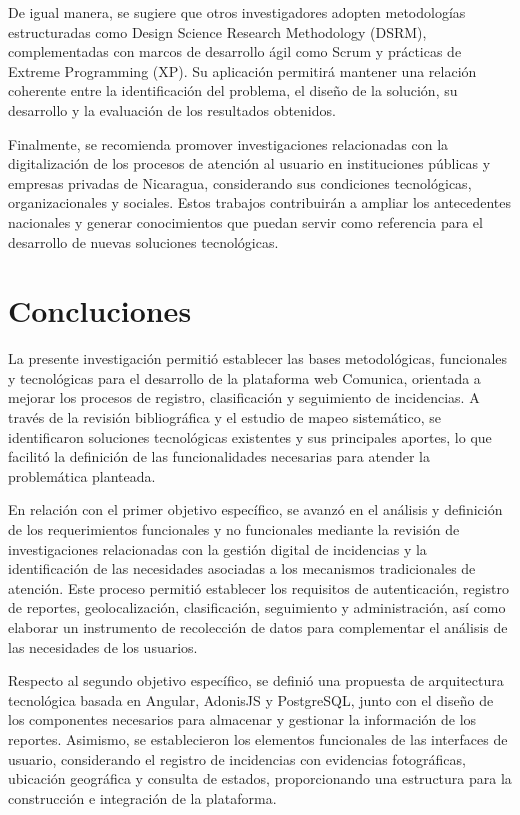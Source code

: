 De igual manera, se sugiere que otros investigadores adopten metodologías estructuradas como Design Science Research Methodology (DSRM), complementadas con marcos de desarrollo ágil como Scrum y prácticas de Extreme Programming (XP). Su aplicación permitirá mantener una relación coherente entre la identificación del problema, el diseño de la solución, su desarrollo y la evaluación de los resultados obtenidos.

Finalmente, se recomienda promover investigaciones relacionadas con la digitalización de los procesos de atención al usuario en instituciones públicas y empresas privadas de Nicaragua, considerando sus condiciones tecnológicas, organizacionales y sociales. Estos trabajos contribuirán a ampliar los antecedentes nacionales y generar conocimientos que puedan servir como referencia para el desarrollo de nuevas soluciones tecnológicas.
\newpage
\section{Concluciones}

La presente investigación permitió establecer las bases metodológicas, funcionales y tecnológicas para el desarrollo de la plataforma web Comunica, orientada a mejorar los procesos de registro, clasificación y seguimiento de incidencias. A través de la revisión bibliográfica y el estudio de mapeo sistemático, se identificaron soluciones tecnológicas existentes y sus principales aportes, lo que facilitó la definición de las funcionalidades necesarias para atender la problemática planteada.

En relación con el primer objetivo específico, se avanzó en el análisis y definición de los requerimientos funcionales y no funcionales mediante la revisión de investigaciones relacionadas con la gestión digital de incidencias y la identificación de las necesidades asociadas a los mecanismos tradicionales de atención. Este proceso permitió establecer los requisitos de autenticación, registro de reportes, geolocalización, clasificación, seguimiento y administración, así como elaborar un instrumento de recolección de datos para complementar el análisis de las necesidades de los usuarios.

Respecto al segundo objetivo específico, se definió una propuesta de arquitectura tecnológica basada en Angular, AdonisJS y PostgreSQL, junto con el diseño de los componentes necesarios para almacenar y gestionar la información de los reportes. Asimismo, se establecieron los elementos funcionales de las interfaces de usuario, considerando el registro de incidencias con evidencias fotográficas, ubicación geográfica y consulta de estados, proporcionando una estructura para la construcción e integración de la plataforma.

